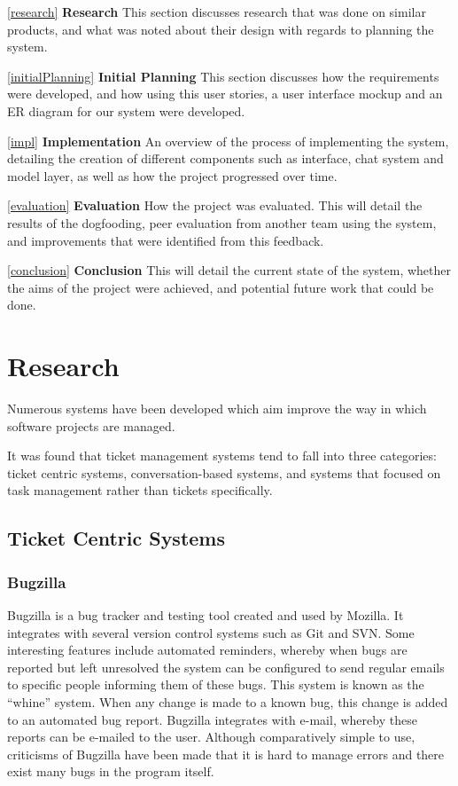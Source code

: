 \documentclass[a4paper]{l3proj}
\begin{document}
\autoref{research} \textbf{Research} 
This section discusses research that was done on similar products, and what was noted about their design with regards to planning the system.

\autoref{initialPlanning} \textbf{Initial Planning} 
This section discusses how the requirements were developed, and how using this user stories, a user interface mockup and an ER diagram for our system were developed.

\autoref{impl} \textbf{Implementation} 
An overview of the process of implementing the system, detailing the creation of different components such as interface, chat system and model layer, as well as how the project progressed over time.

\autoref{evaluation} \textbf{Evaluation} 
How the project was evaluated.  This will detail the results of the dogfooding, peer evaluation from another team using the system, and improvements that were identified from this feedback.

\autoref{conclusion} \textbf{Conclusion} 
This will detail the current state of the system, whether the aims of the project were achieved, and potential future work that could be done.


\chapter{Research}
\label{research}

Numerous systems have been developed which aim improve the way in which software projects are managed.

It was found that ticket management systems tend to fall into three categories: ticket centric systems, conversation-based systems, and systems that focused on task management rather than tickets specifically. 

\section{Ticket Centric Systems}

\subsection{Bugzilla}
\label{bugzilla}

Bugzilla \cite{site:bugzilla} is a bug tracker and testing tool created and used by Mozilla. It integrates with several version control systems such as Git and SVN.  Some interesting features include automated reminders, whereby when bugs are reported but left unresolved the system can be configured to send regular emails to specific people informing them of these bugs. This system is known as the ``whine'' system.  When any change is made to a known bug, this change is added to an automated bug report.  Bugzilla integrates with e-mail, whereby these reports can be e-mailed to the user. Although comparatively simple to use, criticisms of Bugzilla have been made that it is hard to manage errors and there exist many bugs in the program itself.
\end{document}
